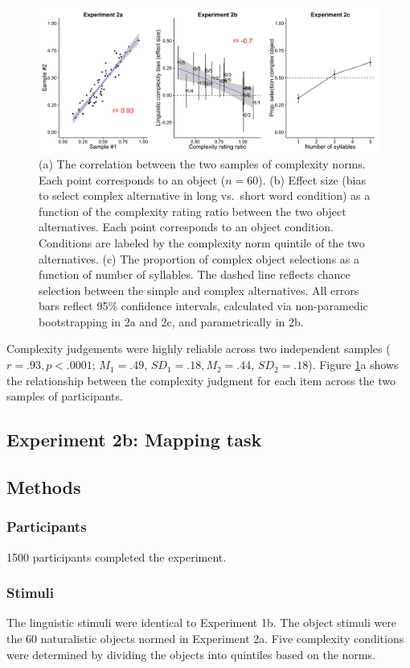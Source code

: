 \documentclass[man]{apa2}
\begin{document}
 \begin{figure} 
  \begin{center} 
    \includegraphics[width=6.2in]{figures/study2_plots.png} 
    \caption{\label{fig:study2_plots} (a) The correlation between the two samples of complexity norms. Each point corresponds to an object ($n = 60$). (b) Effect size (bias to select complex alternative in long vs.\ short word condition) as a function of the complexity rating ratio between the two object alternatives. Each point corresponds to an object condition. Conditions are labeled by the complexity norm quintile of the two alternatives. (c) The proportion of complex object selections as a function of number of syllables. The dashed line reflects chance selection between the simple and complex alternatives. All errors bars reflect  95\% confidence intervals, calculated via non-paramedic bootstrapping in 2a and 2c, and parametrically in 2b.} 
  \end{center} 
\end{figure}	
 Complexity judgements were highly reliable across two independent samples ($r = .93, p < .0001$; $M_1 = .49$, $SD_1 = .18, M_2 = .44$, $SD_2 = .18$). Figure  \ref{fig:study2_plots}a shows the relationship between the complexity judgment for each item across the two samples of participants. 

\subsection{\textbf{Experiment 2b: Mapping task}}
\subsection{Methods}
\subsubsection{Participants} 1500 participants completed the experiment.
\subsubsection{Stimuli} The linguistic stimuli were identical to Experiment 1b. The object stimuli were the 60 naturalistic objects normed in Experiment 2a. Five complexity conditions were determined by dividing the objects into quintiles based on the norms.
\end{document}
